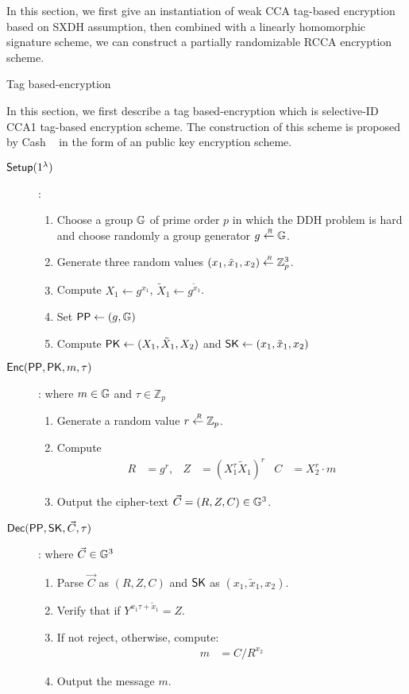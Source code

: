 In this section, we first give an instantiation of weak CCA tag-based encryption based on SXDH assumption,
then combined with a linearly homomorphic signature scheme,
we can construct a partially randomizable RCCA encryption scheme.

\begin{subsection}{Tag based-encryption}

	In this section, we first describe a tag based-encryption which is selective-ID CCA1 tag-based encryption scheme. The construction of this scheme is proposed by Cash \etal~\cite{DBLP:journals/joc/CashKS09} in the form of an public key encryption scheme.

	\begin{description}

	\item[$\boldmath{{\mathsf{Setup}}(1^\lambda)}$] :
	\begin{enumerate}
		\item Choose a group $\mathbb{G}$ of prime order $p$ in which the DDH problem is hard and choose randomly a group generator $g \stackrel{{\scriptscriptstyle \mkern4mu R}}{\gets} \mathbb{G}$.
		\item Generate three random values $(x_1, \tilde{x}_1, x_2) \stackrel{{\scriptscriptstyle \mkern4mu R}}{\gets} \mathbb{Z}_p^3$.
		\item Compute $X_1
		 \gets g^{x_1}$, $\tilde{X}_1 \gets g^{\tilde{x}_1}$.
		\item Set $\mathsf{PP} \gets (g, \mathbb{G})$
		\item Compute $\mathsf{PK} \gets (X_1, \tilde{X}_1, X_2)$ and $\mathsf{SK} \gets (x_1, \tilde{x}_1, x_2)$
	\end{enumerate}
	
	\item[$\boldmath{{\mathsf{Enc}}(\mathsf{PP}, \mathsf{PK}, m, \tau)}$]: where $m \in \mathbb{G}$ and $\tau \in \mathbb{Z}_p$
	\begin{enumerate}
	\item Generate a random value $r \stackrel{{\scriptscriptstyle \mkern4mu R}}{\gets} \mathbb{Z}_p$.
	\item Compute 
	\begin{align}
	R &= g^r, & Z &= (X_1^\tau \tilde{X}_1)^r & C &= X_2^r \cdot m
	\end{align}
	\item Output the cipher-text $\vec{C} = (R, Z, C) \in \mathbb{G}^3$.

	\end{enumerate}

	\item[$\boldmath{{\mathsf{Dec}}(\mathsf{PP}, \mathsf{SK}, \vec{C}, \tau)}$]: where $\vec{C} \in \mathbb{G}^3$
	\begin{enumerate}
	\item Parse $\vec{C}$ as $(R, Z, C)$ and $\mathsf{SK}$ as $(x_1, \tilde{x}_1, x_2)$.
	\item Verify that  if $Y^{x_1 \tau + \tilde{x}_1} = Z$.
	\item If not reject, otherwise, compute:
	\begin{align}
	m &= C/ R^{x_2}
	\end{align}
	\item Output the message $m$.
	\end{enumerate}
	
\end{description}

\end{subsection}


